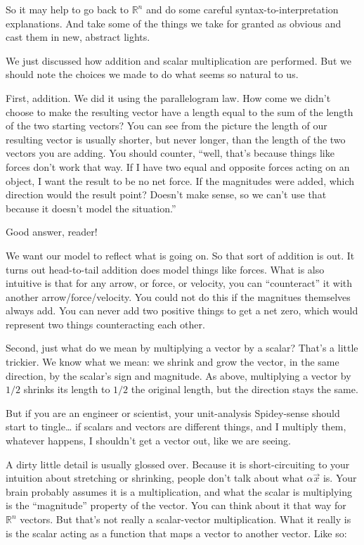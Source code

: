 \documentclass[
]{book}
\begin{document}
So it may help to go back to \(\mathbb{R}^n\) and do some careful syntax-to-interpretation explanations. And take some of the things we take for granted as obvious and cast them in new, abstract lights.

We just discussed how addition and scalar multiplication are performed. But we should note the choices we made to do what seems so natural to us.

First, addition. We did it using the parallelogram law. How come we didn't choose to make the resulting vector have a length equal to the sum of the length of the two starting vectors? You can see from the picture the length of our resulting vector is usually shorter, but never longer, than the length of the two vectors you are adding. You should counter, ``well, that's because things like forces don't work that way. If I have two equal and opposite forces acting on an object, I want the result to be no net force. If the magnitudes were added, which direction would the result point? Doesn't make sense, so we can't use that because it doesn't model the situation.''

Good answer, reader!

We want our model to reflect what is going on. So that sort of addition is out. It turns out head-to-tail addition does model things like forces. What is also intuitive is that for any arrow, or force, or velocity, you can ``counteract'' it with another arrow/force/velocity. You could not do this if the magnitues themselves always add. You can never add two positive things to get a net zero, which would represent two things counteracting each other.

Second, just what do we mean by multiplying a vector by a scalar? That's a little trickier. We know what we mean: we shrink and grow the vector, in the same direction, by the scalar's sign and magnitude. As above, multiplying a vector by \(1/2\) shrinks its length to \(1/2\) the original length, but the direction stays the same.

But if you are an engineer or scientist, your unit-analysis Spidey-sense should start to tingle\ldots{} if scalars and vectors are different things, and I multiply them, whatever happens, I shouldn't get a vector out, like we are seeing.

A dirty little detail is usually glossed over. Because it is short-circuiting to your intuition about stretching or shrinking, people don't talk about what \(\alpha \vec{x}\) is. Your brain probably assumes it is a multiplication, and what the scalar is multiplying is the ``magnitude'' property of the vector. You can think about it that way for \(\mathbb{R}^n\) vectors. But that's not really a scalar-vector multiplication. What it really is is the scalar acting as a function that maps a vector to another vector. Like so:
\end{document}
